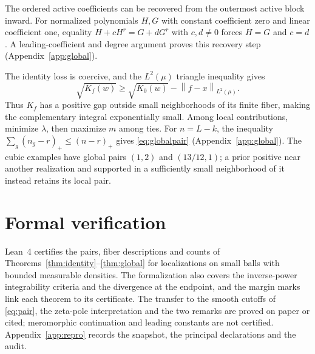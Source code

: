 \documentclass[11pt,letterpaper]{amsart}
\theoremstyle{scplain}
\newcommand{\norm}[1]{\left\lVert#1\right\rVert}
\newcommand{\pos}[1]{(#1)_+}
\begin{document}
The ordered active coefficients can be recovered from the outermost active block inward. For normalized polynomials $H,G$ with constant coefficient zero and linear coefficient one, equality $H+cH^r=G+dG^r$ with $c,d\ne0$ forces $H=G$ and $c=d$. A leading-coefficient and degree argument proves this recovery step (Appendix~\ref{app:global}).

The identity loss is coercive, and the $L^2(\mu)$ triangle inequality gives
\[
 \sqrt{K_f(w)}\ge\sqrt{K_0(w)}-\norm{f-x}_{L^2(\mu)}.
\]
Thus $K_f$ has a positive gap outside small neighborhoods of its finite fiber, making the complementary integral exponentially small. Among local contributions, minimize $\lambda$, then maximize $m$ among ties. For $n=L-k$, the inequality $\sum_g\pos{n_g-r}\le\pos{n-r}$ gives \eqref{eq:globalpair} (Appendix~\ref{app:global}). The cubic examples have global pairs $(1,2)$ and $(13/12,1)$; a prior positive near another realization and supported in a sufficiently small neighborhood of it instead retains its local pair.

\section{Formal verification}\label{sec:formal}
Lean~4 certifies the pairs, fiber descriptions and counts of Theorems~\ref{thm:identity}--\ref{thm:global} for localizations on small balls with bounded measurable densities. The formalization also covers the inverse-power integrability criteria and the divergence at the endpoint, and the margin marks link each theorem to its certificate. The transfer to the smooth cutoffs of \eqref{eq:pair}, the zeta-pole interpretation and the two remarks are proved on paper or cited; meromorphic continuation and leading constants are not certified. Appendix~\ref{app:repro} records the snapshot, the principal declarations and the audit.
\end{document}
